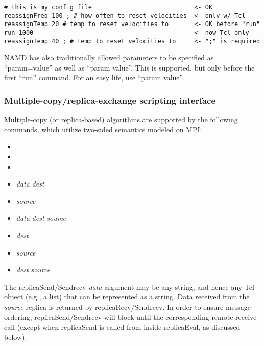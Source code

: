 \begin{verbatim}
# this is my config file                            <- OK
reassignFreq 100 ; # how often to reset velocities  <- only w/ Tcl
reassignTemp 20 # temp to reset velocities to       <- OK before "run"
run 1000                                            <- now Tcl only
reassignTemp 40 ; # temp to reset velocities to     <- ";" is required
\end{verbatim}

NAMD has also traditionally allowed parameters to be specified as
``param=value'' as well as ``param value''.  This is supported, but only
before the first ``run'' command.  For an easy life, use ``param value''.


\subsubsection{Multiple-copy/replica-exchange scripting interface}
\label{section:replicascripting}

Multiple-copy (or replica-based) algorithms are supported by the following commands,
which utilize two-sided semantics modeled on MPI:

\begin{itemize}
  \item {}
  \item {}
  \item {}
  \item {} {\em data} {\em dest}
  \item {} {\em source}
  \item {} {\em data} {\em dest} {\em source}
  \item {} {\em dest}
  \item {} {\em source}
  \item {} {\em dest} {\em source}
\end{itemize}

The replicaSend/Sendrecv {\em data} argument may be any string,
and hence any Tcl object (e.g., a list) that can be represented as a string.
Data received from the {\em source} replica is returned by replicaRecv/Sendrecv.
In order to ensure message ordering, replicaSend/Sendrecv will block
until the corresponding remote receive call (except when replicaSend
is called from inside replicaEval, as discussed below).

